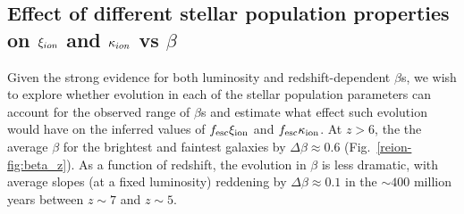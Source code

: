 \subsection{Effect of different stellar population properties on $\xi_{\lowercase{ion}}$ and $\kappa_{\lowercase{ion}}$ vs $\beta$}\label{reion-sec:beta_effect_stellar_pop}
Given the strong evidence for both luminosity and redshift-dependent $\beta$s, we wish to explore whether evolution in each of the stellar population parameters can account for the observed range of $\beta$s and estimate what effect such evolution would have on the inferred values of $f_{\rm{esc}}\xi_{\rm{ion}}$ and $f_{\rm{esc}}\kappa_{\rm{ion}}$. At $z >6$, the the average $\beta$ for the brightest and faintest galaxies by $\Delta\beta \approx 0.6$ (Fig.~\ref{reion-fig:beta_z}). As a function of redshift, the evolution in $\beta$ is less dramatic, with average slopes (at a fixed luminosity) reddening by $\Delta\beta \approx 0.1$ in the $\sim400$ million years between $z\sim7$ and $z\sim5$.

